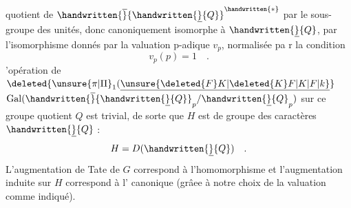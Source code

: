 quotient de $\handwritten{\overline}{\handwritten{\underline}{Q}}^{\handwritten{*}}$ par le sous-groupe des unités, donc canoniquement isomorphe à $\handwritten{\underline}{Q}$, par l'isomorphisme
donnés par la valuation p-adique $v_p$, normalisée pa r la condition
\[
v_p(p)=1\quad .
\]
'opération de $\deleted{\unsure{\pi|\Pi}_1(\underline{\unsure{\deleted{F}K|\deleted{K}F|K|F|k}}}$ $\operatorname{Gal}(\handwritten{\overline}{\handwritten{\underline}{Q}}_p/\handwritten{\underline}{Q}_p)$ sur ce groupe quotient $Q$ est trivial, de sorte que $H$ est  de groupe des caractères $\handwritten{\underline}{Q}$ :
\[
H=D(\handwritten{\underline}{Q})\quad .
\]
L'augmentation de Tate de $G$ correspond à l'homomorphisme
et l'augmentation induite sur $H$ correspond à l' canonique
(grâee à notre choix de la valuation  comme indiqué).

